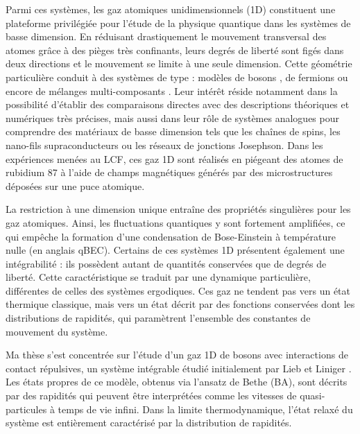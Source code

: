 Parmi ces systèmes, les gaz atomiques unidimensionnels (1D) constituent une plateforme privilégiée pour l’étude de la physique quantique dans les systèmes de basse dimension. En réduisant drastiquement le mouvement transversal des atomes grâce à des pièges très confinants, leurs degrés de liberté sont figés dans deux directions et le mouvement se limite à une seule dimension. Cette géométrie particulière conduit à des systèmes de type : modèles de bosons \cite{Bloch2005,Kinoshita2004,Haller2009,Amerongen2008,Jacqmin2011,Dubail2025SolitonsOndes}, de fermions \cite{Guan2013,Liao2010,Moritz2005} ou encore de mélanges multi-composants \cite{Pagano2014}. Leur intérêt réside notamment dans la possibilité d’établir des comparaisons directes avec des descriptions théoriques et numériques très précises, mais aussi dans leur rôle de systèmes analogues pour comprendre des matériaux de basse dimension tels que les chaînes de spins, les nano-fils supraconducteurs ou les réseaux de jonctions Josephson. Dans les expériences menées au \gls{LCF}, ces gaz 1D sont réalisés en piégeant des atomes de rubidium 87 à l’aide de champs magnétiques générés par des microstructures déposées sur une puce atomique.

\medskip

La restriction à une dimension unique entraîne des propriétés singulières pour les gaz atomiques. Ainsi, les fluctuations quantiques y sont fortement amplifiées, ce qui empêche la formation d’une condensation de Bose-Einstein à température nulle (en anglais \gls{qBEC}). Certains de ces systèmes 1D présentent également une intégrabilité : ils possèdent autant de quantités conservées que de degrés de liberté. Cette caractéristique se traduit par une dynamique particulière, différentes de celles des systèmes ergodiques. Ces gaz ne tendent pas vers un état thermique classique, mais vers un état décrit par des fonctions conservées dont les distributions de rapidités, qui paramètrent l’ensemble des constantes de mouvement du système.

\medskip

Ma thèse s’est concentrée sur l’étude d’un gaz 1D de bosons avec interactions de contact répulsives, un système intégrable étudié initialement par Lieb et Liniger \cite{LL_1963_1,LL_1963_2}. Les états propres de ce modèle, obtenus via l’ansatz de Bethe (\acrshort{BA}), sont décrits par des rapidités qui peuvent être interprétées comme les vitesses de quasi-particules à temps de vie infini. Dans la limite thermodynamique, l’état relaxé du système est entièrement caractérisé par la distribution de rapidités.  

